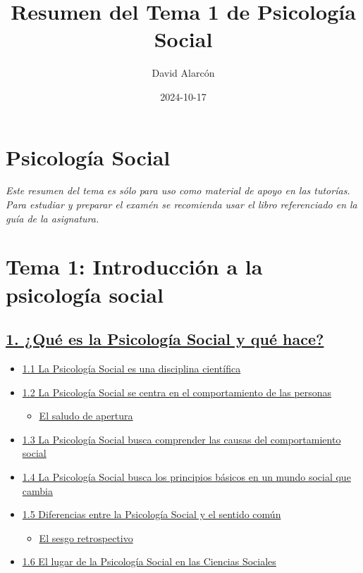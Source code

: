 \documentclass[
]{website}
\title{Resumen del Tema 1 de Psicología Social}
\author{David Alarcón}
\date{2024-10-17}
\providecommand{\tightlist}{%
  \setlength{\itemsep}{0pt}\setlength{\parskip}{0pt}}
\begin{document}
\maketitle

{
\setcounter{tocdepth}{2}
\tableofcontents
}
\section*{Psicología Social}\label{book}

\emph{Este resumen del tema es sólo para uso como material de apoyo en las tutorías. Para estudiar y preparar el examén se recomienda usar el libro referenciado en la guía de la asignatura.}

\section*{Tema 1: Introducción a la psicología social}\label{tema-1-introducciuxf3n-a-la-psicologuxeda-social}

\subsection*{\texorpdfstring{\hyperref[tema1]{1. ¿Qué es la Psicología Social y qué hace?}}{1. ¿Qué es la Psicología Social y qué hace?}}\label{quuxe9-es-la-psicologuxeda-social-y-quuxe9-hace}

\begin{itemize}
\tightlist
\item
  \hyperref[subtema1_1]{1.1 La Psicología Social es una disciplina científica}
\item
  \hyperref[subtema1_2]{1.2 La Psicología Social se centra en el comportamiento de las personas}

  \begin{itemize}
  \tightlist
  \item
    \hyperref[cuadro1_2_1]{El saludo de apertura}
  \end{itemize}
\item
  \hyperref[subtema1_3]{1.3 La Psicología Social busca comprender las causas del comportamiento social}
\item
  \hyperref[subtema1_4]{1.4 La Psicología Social busca los principios básicos en un mundo social que cambia}
\item
  \hyperref[subtema1_5]{1.5 Diferencias entre la Psicología Social y el sentido común}

  \begin{itemize}
  \tightlist
  \item
    \hyperref[subtema1_5_1]{El sesgo retrospectivo}
  \end{itemize}
\item
  \hyperref[subtema1_6]{1.6 El lugar de la Psicología Social en las Ciencias Sociales}
\end{itemize}
\end{document}
